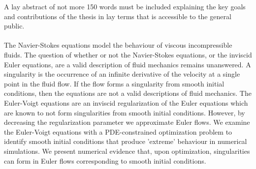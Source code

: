 
A lay abstract of not more 150 words must be included explaining the key goals and contributions of the thesis in lay terms that is accessible to the general public. 
\\~\\
The Navier-Stokes equations model the behaviour of viscous incompressible fluids. The question of whether or not the Navier-Stokes equations, or the inviscid Euler equations, are a valid description of fluid mechanics remains unanswered. A singularity is the occurrence of an infinite derivative of the velocity at a single point in the fluid flow. If the flow forms a singularity from smooth initial conditions, then the equations are not a valid descriptions of fluid mechanics. The Euler-Voigt equations are an inviscid regularization of the Euler equations which are known to not form singularities from smooth initial conditions. However, by decreasing the regularization parameter we approximate Euler flows. We examine the Euler-Voigt equations with a PDE-constrained optimization problem to identify smooth initial conditions that produce 'extreme' behaviour in numerical simulations. {\color{red}We present numerical evidence that, upon optimization, singularities can form in Euler flows corresponding to smooth initial conditions.}
